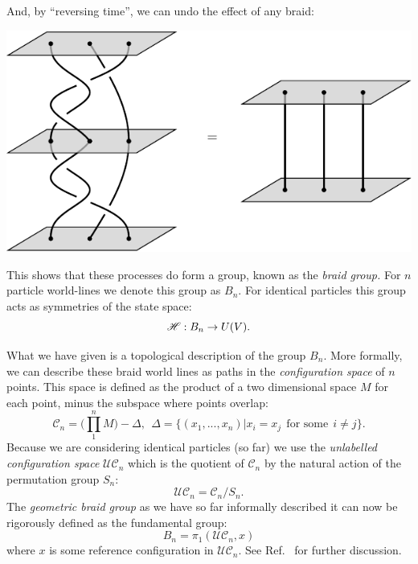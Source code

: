 \documentclass[aps, tightenlines, letterpaper, onecolumn, superscriptaddress, notitlepage, 11pt, groupedaddress]{revtex4-1}
\begin{document}
And, by ``reversing time'', we can undo the effect of
any braid:
\begin{center}
\includegraphics[]{pic-braid-inverse.pdf}
\end{center}
This shows that these processes do form a group,
known as the \emph{braid group.}
For $n$ particle world-lines we denote this group as $B_n.$
For identical particles this group acts as symmetries of the
state space:
$$
    \mathscr{H} : B_n \to U(V).
$$

What we have given is a topological description of the group $B_n$.
More formally, we can describe these braid world lines as
paths in the \emph{configuration space} of $n$ points.
\newcommand{\Conf}{\mathcal{C}}
\newcommand{\UConf}{\mathcal{UC}}
This space is defined as the product of
a two dimensional space $M$ for each point, minus the subspace where points overlap:
$$
    \Conf_n = \bigl( \prod_{1}^{n} M \bigr) - \Delta, \ \ 
    \Delta = \{(x_1, ..., x_n) | x_i = x_j \ \ \mbox{for some} \ \ i\ne j \}.
$$
Because we are considering identical particles (so far)
we use the \emph{unlabelled configuration space}
$\UConf_n$ which is the quotient of $\Conf_n$ by the natural action of the
permutation group $S_n:$
$$
    \UConf_n = \Conf_n / S_n.
$$
The \emph{geometric braid group} as we have so far informally described it 
can now be rigorously defined as the fundamental group:
$$
    B_n = \pi_1 ( \UConf_n, x )
$$
where $x$ is some reference configuration in $\UConf_n.$
See Ref.~\cite{Ghrist2014} for further discussion.
\end{document}
